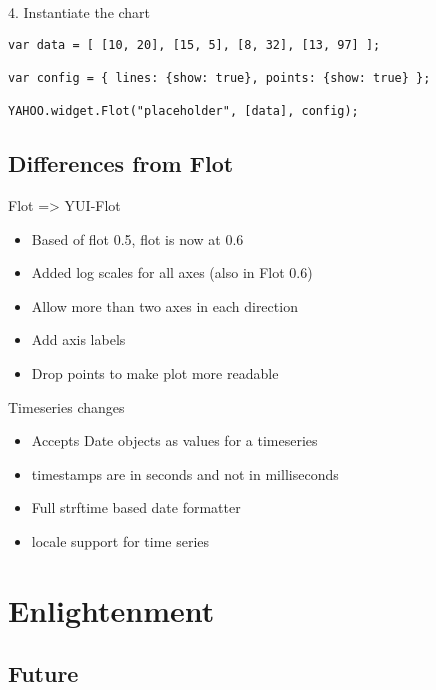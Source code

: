 \documentclass{beamer}
\begin{document}
\begin{frame}[fragile]{4. Instantiate the chart}
\begin{block}{}
\tiny{\begin{verbatim}
var data = [ [10, 20], [15, 5], [8, 32], [13, 97] ];

var config = { lines: {show: true}, points: {show: true} };

YAHOO.widget.Flot("placeholder", [data], config);
\end{verbatim}}
\end{block}
\end{frame}

\subsection{Differences from Flot}

\begin{frame}{Flot => YUI-Flot}
\begin{itemize}
\item Based of flot 0.5, flot is now at 0.6
\item Added log scales for all axes (also in Flot 0.6)
\item Allow more than two axes in each direction
\item Add axis labels
\item Drop points to make plot more readable
\end{itemize}
\end{frame}

\begin{frame}{Timeseries changes}
\begin{itemize}
\item Accepts Date objects as values for a timeseries
\item timestamps are in seconds and not in milliseconds
\item Full strftime based date formatter
\item locale support for time series
\end{itemize}
\end{frame}

\section{Enlightenment}
\subsection{Future}
\end{document}
